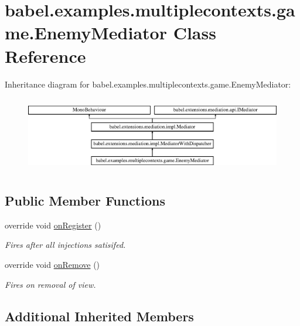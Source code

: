 \hypertarget{classbabel_1_1examples_1_1multiplecontexts_1_1game_1_1_enemy_mediator}{\section{babel.\-examples.\-multiplecontexts.\-game.\-Enemy\-Mediator Class Reference}
\label{classbabel_1_1examples_1_1multiplecontexts_1_1game_1_1_enemy_mediator}
}
Inheritance diagram for babel.\-examples.\-multiplecontexts.\-game.\-Enemy\-Mediator\-:\begin{figure}[H]
\begin{center}
\leavevmode
\includegraphics[height=3.333333cm]{classbabel_1_1examples_1_1multiplecontexts_1_1game_1_1_enemy_mediator}
\end{center}
\end{figure}
\subsection*{Public Member Functions}
\begin{DoxyCompactItemize}
\item 
override void \hyperlink{classbabel_1_1examples_1_1multiplecontexts_1_1game_1_1_enemy_mediator_a5acadeb51fd09fd30f6da9c5d7ca9f3a}{on\-Register} ()
\begin{DoxyCompactList}\small\item\em Fires after all injections satisifed. \end{DoxyCompactList}\item 
override void \hyperlink{classbabel_1_1examples_1_1multiplecontexts_1_1game_1_1_enemy_mediator_a2c5abab1d577a583238d326312f78915}{on\-Remove} ()
\begin{DoxyCompactList}\small\item\em Fires on removal of view. \end{DoxyCompactList}\end{DoxyCompactItemize}
\subsection*{Additional Inherited Members}


